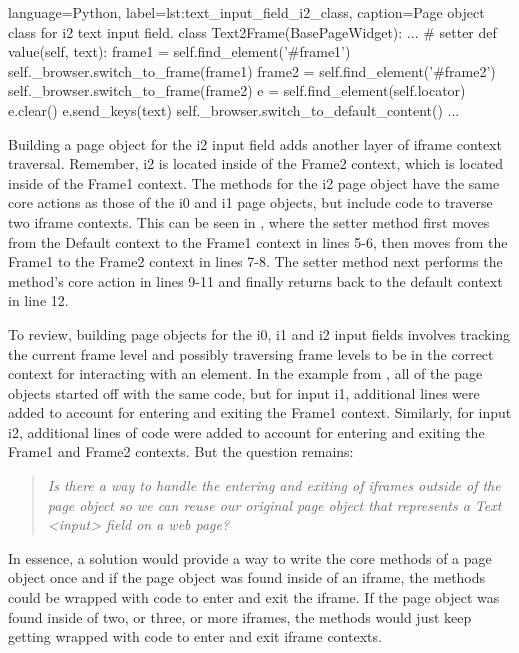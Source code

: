\begin{xcode}{%
  language=Python,%
  label=lst:text_input_field_i2_class,%
  caption={Page object class for i2 text input field.}%
}
class Text2Frame(BasePageWidget):
    ...
    # setter
    def value(self, text):
        frame1 = self.find_element('#frame1')
        self._browser.switch_to_frame(frame1)
        frame2 = self.find_element('#frame2')
        self._browser.switch_to_frame(frame2)
        e = self.find_element(self.locator)
        e.clear()
        e.send_keys(text)
        self._browser.switch_to_default_content()
    ...
\end{xcode}

Building a page object for the i2 input field adds another layer of iframe
context traversal.  Remember, i2 is located inside of the Frame2 context, which
is located inside of the Frame1 context. The methods for the i2 page object
have the same core actions as those of the i0 and i1 page objects, but include
code to traverse two iframe contexts. This can be seen in
, where the setter method first moves from
the Default context to the Frame1 context in lines 5-6, then moves from the
Frame1 to the Frame2 context in lines 7-8. The setter method next performs the
method's core action in lines 9-11 and finally returns back to the default
context in line 12.


To review, building page objects for the i0, i1 and i2 input fields involves
tracking the current frame level and possibly traversing frame levels to be in
the correct context for interacting with an element.  In the example from
, all of the page objects
started off with the same code, but for input i1, additional lines were added
to account for entering and exiting the Frame1 context.  Similarly, for input
i2, additional lines of code were added to account for entering and exiting the
Frame1 and Frame2 contexts.  But the question remains: \begin{quote}\textit{Is there a way
to handle the entering and exiting of iframes outside of the page object so we
can reuse our original page object that represents a Text <input> field on a
web page?}\end{quote}

In essence, a solution would provide a way to write the core methods of a page
object once and if the page object was found inside of an iframe, the methods
could be wrapped with code to enter and exit the iframe. If the page object was
found inside of two, or three, or more iframes, the methods would just keep
getting wrapped with code to enter and exit iframe contexts.


